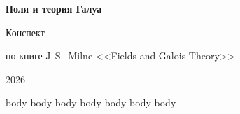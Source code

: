 \documentclass[11pt,a4paper,oneside,openany]{book}
\begin{document}
\sloppy
\frontmatter
\begin{titlepage}
\centering
\vspace*{4cm}
{\Huge\bfseries Поля и теория Галуа\par}
\vspace{0.9cm}
{\LARGE Конспект\par}
\vspace{1.6cm}
{\large по книге J.\,S.~Milne <<Fields and Galois Theory>>\par}
\vfill
{\large 2026\par}
\end{titlepage}


\tableofcontents

\mainmatter
\setcounter{chapter}{0}
{body}
\setcounter{chapter}{1}
{body}
\setcounter{chapter}{2}
{body}
\setcounter{chapter}{3}
{body}
\setcounter{chapter}{4}
{body}
\setcounter{chapter}{5}
{body}
\setcounter{chapter}{6}
{body}
\end{document}
